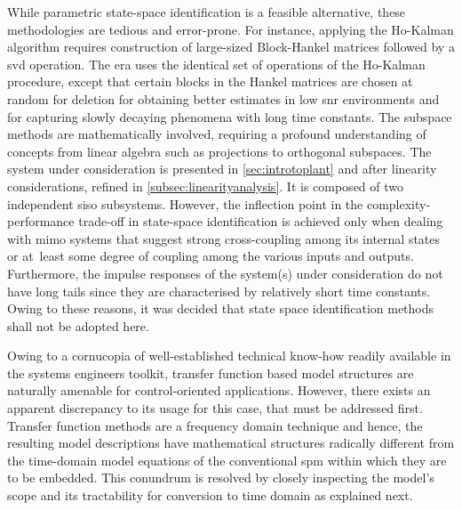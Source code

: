 While  parametric state-space  identification is  a feasible  alternative, these
methodologies are tedious and error-prone.  For instance, applying the Ho-Kalman
algorithm requires construction of large-sized Block-Hankel matrices followed by
a  \gls{svd} operation.  The  \gls{era}  uses the  identical  set of  operations
of  the  Ho-Kalman   procedure,  except  that  certain  blocks   in  the  Hankel
matrices  are chosen  at  random  for deletion  for  obtaining better  estimates
in  low  \gls{snr} environments  and  for  capturing slowly  decaying  phenomena
with  long time  constants. The  subspace methods  are mathematically  involved,
requiring  a  profound  understanding  of  concepts  from  linear  algebra  such
as  projections  to orthogonal  subspaces.  The  system under  consideration  is
presented in \cref{sec:introtoplant} and after linearity considerations, refined
in \cref{subsec:linearityanalysis}. It is composed of two independent \gls{siso}
subsystems.  However,   the  inflection  point  in   the  complexity-performance
trade-off  in state-space  identification  is achieved  only  when dealing  with
\gls{mimo} systems that suggest strong  cross-coupling among its internal states
or  at~least  some degree  of  coupling among  the various  inputs and  outputs.
Furthermore, the impulse  responses of the system(s) under  consideration do not
have long tails since they are characterised by relatively short time constants.
Owing to these  reasons, it was decided that state  space identification methods
shall not be adopted here.

Owing to a  cornucopia of well-established technical  know-how readily available
in the systems  engineers toolkit, transfer function based  model structures are
naturally amenable  for control-oriented applications. However,  there exists an
apparent discrepancy to  its usage for this case, that  must be addressed first.
Transfer  function methods  are  a  frequency domain  technique  and hence,  the
resulting model  descriptions have  mathematical structures  radically different
from the time-domain model equations  of the conventional \gls{spm} within which
they are  to be embedded. This  conundrum is resolved by  closely inspecting the
model's scope  and its tractability for  conversion to time domain  as explained
next.

